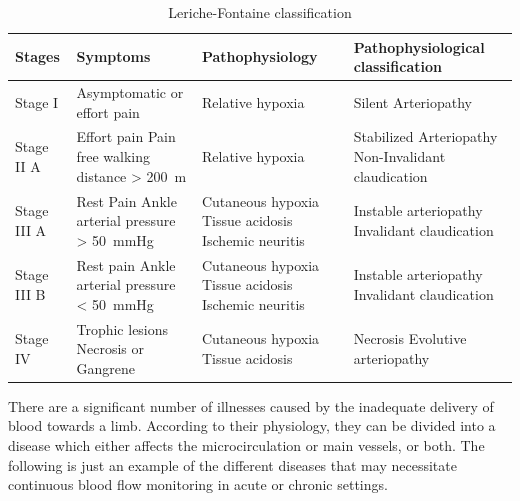 \begin{table}
	\caption{Leriche-Fontaine classification}
	\centering
	\label{table:Fontaine}
	\begin{tabular}{p{1.8cm} >{\raggedright}p{3.6cm} p{3.4cm} p{4.8cm}}
		\toprule
		\textbf{Stages}& \textbf{Symptoms} & \textbf{Pathophysiology} & \textbf{Pathophysiological \newline classification} \\
		\midrule
		Stage I & Asymptomatic or effort pain & Relative hypoxia & Silent Arteriopathy \\
		\midrule
		Stage II A & Effort pain \newline Pain free walking distance > \SI{200}{\meter} & Relative hypoxia & Stabilized Arteriopathy \newline Non-Invalidant claudication \\ 
		\midrule
		Stage III A & Rest Pain \newline Ankle arterial pressure > \SI{50}{\mmHg} & Cutaneous hypoxia \newline Tissue acidosis \newline Ischemic neuritis & Instable arteriopathy \newline Invalidant claudication \\
		\midrule
		Stage III B & Rest pain \newline Ankle arterial pressure < \SI{50}{\mmHg} & Cutaneous hypoxia \newline Tissue acidosis \newline Ischemic neuritis & Instable arteriopathy \newline
		Invalidant claudication \\
		\midrule
		Stage IV & Trophic lesions \newline Necrosis or Gangrene & Cutaneous hypoxia \newline 
		Tissue acidosis & Necrosis \newline Evolutive arteriopathy \\
		\bottomrule
	\end{tabular}
\end{table}

There are a significant number of illnesses caused by the inadequate delivery of blood towards a limb. According to their physiology, they can be divided into a disease which either affects the microcirculation or main vessels, or both. The following is just an example of the different diseases that may necessitate continuous blood flow monitoring in acute or chronic settings.

